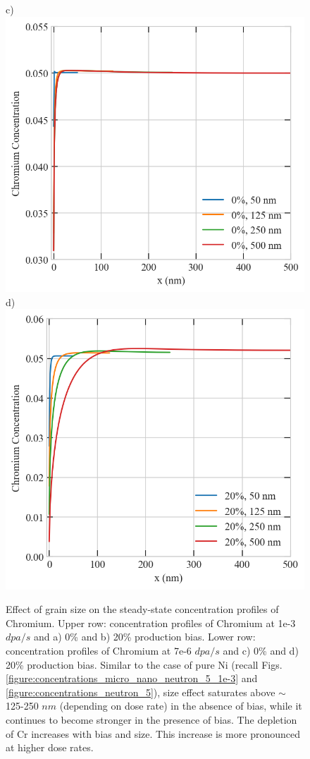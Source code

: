 \documentclass[utf8]{frontiersSCNS} %
\begin{document}
\begin{figure}[h!]
        c)\includegraphics[scale=0.55]{srrt/plots/Fig14_c.png}
        d)\includegraphics[scale=0.55]{srrt/plots/Fig14_d.png}
        \caption{Effect of grain size on the steady-state concentration profiles of Chromium. Upper row: concentration profiles of Chromium at 1e-3 $dpa/s$  and a) 0\% and b) 20\% production bias. Lower row: concentration profiles of Chromium at 7e-6 $dpa/s$  and c) 0\% and d) 20\% production bias. Similar to the case of pure Ni (recall Figs. \ref{figure:concentrations_micro_nano_neutron_5_1e-3} and \ref{figure:concentrations_neutron_5}), size effect saturates above $\sim$ 125-250 $nm$ (depending on dose rate) in the absence of bias, while it continues to become stronger in the presence of bias. The depletion of Cr increases with bias and size. This increase is more pronounced at higher dose rates.}
        \label{figure:RIS_Cr_50_125_250_500nm_773K}
    \end{figure}
   
\end{document}
